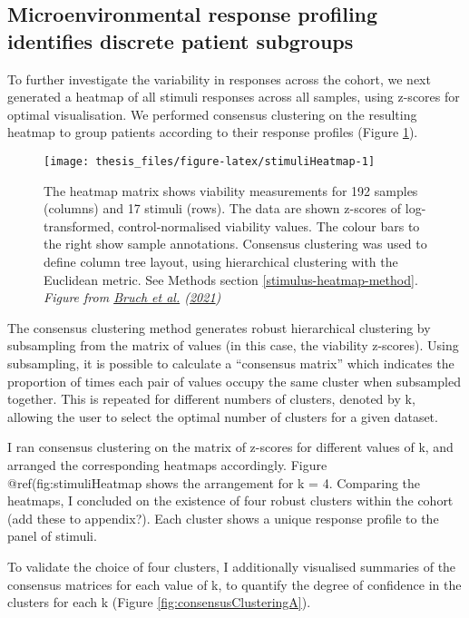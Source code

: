 \documentclass[11pt, a4paper, twosided]{book}
\begin{document}
\hypertarget{clusters}{%
\subsection{Microenvironmental response profiling identifies discrete patient subgroups}\label{clusters}}

To further investigate the variability in responses across the cohort, we next generated a heatmap of all stimuli responses across all samples, using z-scores for optimal visualisation. We performed consensus clustering on the resulting heatmap to group patients according to their response profiles (Figure \ref{fig:stimuliHeatmap}).


\begin{figure}

{\centering \texttt{[image: thesis\_files/figure-latex/stimuliHeatmap-1]} 

}

\caption{The heatmap matrix shows viability measurements for 192 samples (columns) and 17 stimuli (rows). The data are shown z-scores of log-transformed, control-normalised viability values. The colour bars to the right show sample annotations. Consensus clustering was used to define column tree layout, using hierarchical clustering with the Euclidean metric. See Methods section \ref{stimulus-heatmap-method}. \emph{Figure from \protect\hyperlink{ref-Giles2021}{Bruch et al.} (\protect\hyperlink{ref-Giles2021}{2021}) }}\label{fig:stimuliHeatmap}
\end{figure}
The consensus clustering method generates robust hierarchical clustering by subsampling from the matrix of values (in this case, the viability z-scores). Using subsampling, it is possible to calculate a ``consensus matrix'' which indicates the proportion of times each pair of values occupy the same cluster when subsampled together. This is repeated for different numbers of clusters, denoted by k, allowing the user to select the optimal number of clusters for a given dataset.

I ran consensus clustering on the matrix of z-scores for different values of k, and arranged the corresponding heatmaps accordingly. Figure @ref(fig:stimuliHeatmap shows the arrangement for k = 4. Comparing the heatmaps, I concluded on the existence of four robust clusters within the cohort (add these to appendix?). Each cluster shows a unique response profile to the panel of stimuli.

To validate the choice of four clusters, I additionally visualised summaries of the consensus matrices for each value of k, to quantify the degree of confidence in the clusters for each k (Figure \ref{fig:consensusClusteringA}).
\end{document}
